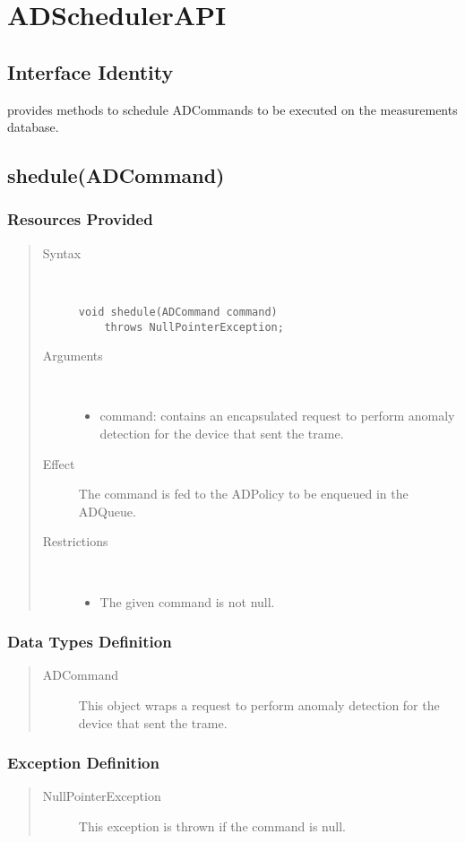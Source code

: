\section{ADSchedulerAPI}

\subsection{Interface Identity}

\npar {} provides methods to schedule
ADCommands to be executed on the measurements database.

\subsection{shedule(ADCommand)}

\subsubsection{Resources Provided}

\begin{quote}
	\begin{description}
		\item[Syntax] \ 
		\begin{verbatim}
void shedule(ADCommand command)
    throws NullPointerException;
		\end{verbatim}
		\item[Arguments] \
		\begin{itemize}
			\item command: contains an encapsulated request to perform anomaly detection
			for the device that sent the trame.
		\end{itemize}
		\item[Effect] The command is fed to the ADPolicy to be enqueued in the
		ADQueue.
		\item[Restrictions] \ 
		\begin{itemize}
			\item The given command is not null.
		\end{itemize}
	\end{description} 
\end{quote}

\subsubsection{Data Types Definition}

\begin{quote}
	\begin{description}
		\item[ADCommand] This object wraps a request to perform anomaly detection for
		the device that sent the trame.	
	\end{description} 
\end{quote}

\subsubsection{Exception Definition}

\begin{quote}
	\begin{description}
		\item[NullPointerException] This exception is thrown if the command is null.
	\end{description} 
\end{quote}